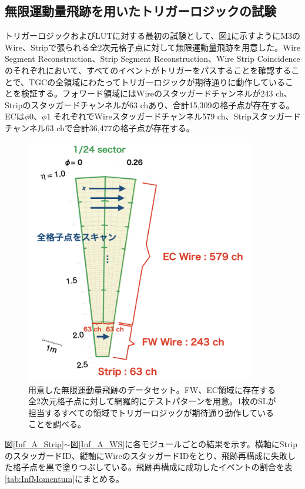 \subsection{無限運動量飛跡を用いたトリガーロジックの試験}
トリガーロジックおよびLUTに対する最初の試験として、図\ref{InfMomentum}に示すようにM3のWire、Stripで張られる全2次元格子点に対して無限運動量飛跡を用意した。Wire Segment Reconstruction、Strip Segment Reconstruction、Wire Strip Coincidenceのそれぞれにおいて、すべてのイベントがトリガーをパスすることを確認することで、TGCの全領域にわたってトリガーロジックが期待通りに動作していることを検証する。フォワード領域にはWireのスタッガードチャンネルが243 ch、Stripのスタッガードチャンネルが63 chあり、合計15,309の格子点が存在する。ECは$\phi$0、$\phi$1 それぞれでWireスタッガードチャンネル579 ch、Stripスタッガードチャンネル63 chで合計36,477の格子点が存在する。

\begin{figure} 
\centering
\includegraphics[width=10cm]{fig/Test/InfMomentum.png}
\caption[用意した無限運動量飛跡のデータセット]{用意した無限運動量飛跡のデータセット。FW、EC領域に存在する全2次元格子点に対して網羅的にテストパターンを用意。1枚のSLが担当するすべての領域でトリガーロジックが期待通り動作していることを調べる。}
\label{InfMomentum}
\end{figure}

図\ref{Inf_A_Strip}$\sim$図\ref{Inf_A_WS}に各モジュールごとの結果を示す。横軸にStripのスタッガードID、縦軸にWireのスタッガードIDをとり、飛跡再構成に失敗した格子点を黒で塗りつぶしている。飛跡再構成に成功したイベントの割合を表\ref{tab:InfMomentum}にまとめる。

